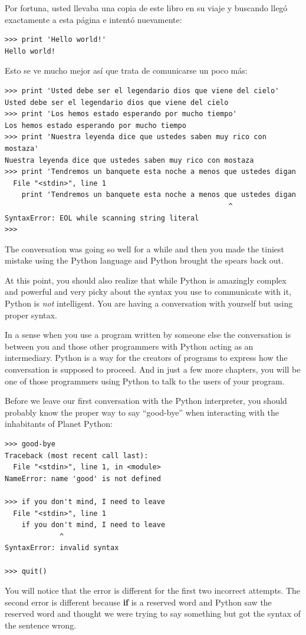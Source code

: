 Por fortuna, usted llevaba una copia de este libro en su viaje y buscando lleg\'o exactamente a esta p\'agina e intent\'o nuevamente:

\beforeverb
\begin{verbatim}
>>> print 'Hello world!'
Hello world!
\end{verbatim}
\afterverb
%
Esto se ve mucho mejor as\'i que trata de comunicarse un poco m\'as:

\beforeverb
\begin{verbatim}
>>> print 'Usted debe ser el legendario dios que viene del cielo'
Usted debe ser el legendario dios que viene del cielo
>>> print 'Los hemos estado esperando por mucho tiempo'
Los hemos estado esperando por mucho tiempo
>>> print 'Nuestra leyenda dice que ustedes saben muy rico con mostaza'
Nuestra leyenda dice que ustedes saben muy rico con mostaza
>>> print 'Tendremos un banquete esta noche a menos que ustedes digan
  File "<stdin>", line 1
    print 'Tendremos un banquete esta noche a menos que ustedes digan
                                                     ^
SyntaxError: EOL while scanning string literal
>>> 
\end{verbatim}
\afterverb
%
The conversation was going so well for a while and then you
made the tiniest mistake using the Python language and Python 
brought the spears back out.

At this point, you should also realize that while Python 
is amazingly complex and powerful and very picky about 
the syntax you use to communicate with it, Python is {\em 
not} intelligent.  You are having a conversation with 
yourself but using proper syntax.

In a sense when you use a program written by someone else
the conversation is between you and those other
programmers with Python acting as an intermediary.  Python
is a way for the creators of programs to express how the 
conversation is supposed to proceed.  And
in just a few more chapters, you will be one of those
programmers using Python to talk to the users of your program.

Before we leave our first conversation with the Python 
interpreter, you should probably know the proper way
to say ``good-bye'' when interacting with the inhabitants
of Planet Python:

\beforeverb
\begin{verbatim}
>>> good-bye
Traceback (most recent call last):
  File "<stdin>", line 1, in <module>
NameError: name 'good' is not defined

>>> if you don't mind, I need to leave
  File "<stdin>", line 1
    if you don't mind, I need to leave
             ^
SyntaxError: invalid syntax

>>> quit()
\end{verbatim}
\afterverb
%
You will notice that the error is different for the first two
incorrect attempts.   The second error is different because 
{\bf if} is a reserved word and Python saw the reserved word
and thought we were trying to say something but got the syntax
of the sentence wrong.

